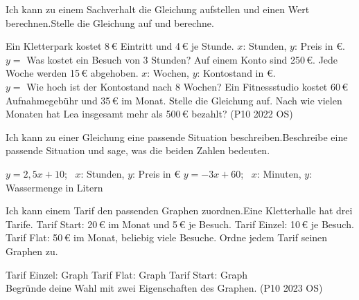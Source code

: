 \begin{aufgabe}{Ich kann zu einem Sachverhalt die Gleichung aufstellen und einen Wert berechnen.\newline Stelle die Gleichung auf und berechne.}
\begin{teile}
\teil Ein Kletterpark kostet 8\,€ Eintritt und 4\,€ je Stunde. $x$: Stunden, $y$: Preis in €. \\ $y = $ \leerfeld
\teil Was kostet ein Besuch von 3 Stunden? \quad \leerfeld[€]
\teil Auf einem Konto sind 250\,€. Jede Woche werden 15\,€ abgehoben. $x$: Wochen, $y$: Kontostand in €. \\ $y = $ \leerfeld
\teil Wie hoch ist der Kontostand nach 8 Wochen? \quad \leerfeld[€]
\teil Ein Fitnessstudio kostet 60\,€ Aufnahmegebühr und 35\,€ im Monat. Stelle die Gleichung auf. Nach wie vielen Monaten hat Lea insgesamt mehr als 500\,€ bezahlt? (P10 2022 OS)
\end{teile}
\end{aufgabe}

\begin{aufgabe}{Ich kann zu einer Gleichung eine passende Situation beschreiben.\newline Beschreibe eine passende Situation und sage, was die beiden Zahlen bedeuten.}
\begin{teile}
\teil $y = 2{,}5x + 10$; \ $x$: Stunden, $y$: Preis in €
\teil $y = -3x + 60$; \ $x$: Minuten, $y$: Wassermenge in Litern
\end{teile}
\end{aufgabe}


\begin{aufgabe}{Ich kann einem Tarif den passenden Graphen zuordnen.\newline Eine Kletterhalle hat drei Tarife. Tarif Start: 20\,€ im Monat und 5\,€ je Besuch. Tarif Einzel: 10\,€ je Besuch. Tarif Flat: 50\,€ im Monat, beliebig viele Besuche. Ordne jedem Tarif seinen Graphen zu.}

\noindent\begin{minipage}[t]{0.42\linewidth}\vspace{0pt}
\begin{ksys}[xmin=0,xmax=8,ymin=0,ymax=90,ystep=10,ablesen,xlabel=$x$ Besuche,ylabel=$y$ in €]
\end{ksys}
\end{minipage}\hfill
\begin{minipage}[t]{0.55\linewidth}\vspace{0pt}
\begin{teile}
\teil Tarif Einzel: \quad Graph \leerfeld
\teil Tarif Flat: \quad Graph \leerfeld
\teil Tarif Start: \quad Graph \leerfeld \\ Begründe deine Wahl mit zwei Eigenschaften des Graphen. (P10 2023 OS)
\end{teile}
\end{minipage}
\end{aufgabe}

